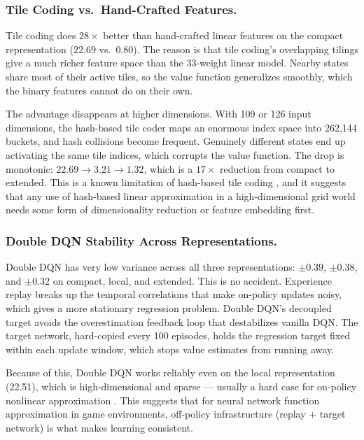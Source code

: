 \documentclass[letterpaper]{article}
\begin{document}
\subsubsection{Tile Coding vs.\ Hand-Crafted Features.}

Tile coding does $28\times$ better than hand-crafted linear features on the compact representation ($22.69$ vs.\ $0.80$). The reason is that tile coding's overlapping tilings give a much richer feature space than the 33-weight linear model. Nearby states share most of their active tiles, so the value function generalizes smoothly, which the binary features cannot do on their own.

The advantage disappears at higher dimensions. With 109 or 126 input dimensions, the hash-based tile coder maps an enormous index space into 262,144 buckets, and hash collisions become frequent. Genuinely different states end up activating the same tile indices, which corrupts the value function. The drop is monotonic: $22.69 \to 3.21 \to 1.32$, which is a $17\times$ reduction from compact to extended. This is a known limitation of hash-based tile coding \cite{sherstov2005tilecoding}, and it suggests that any use of hash-based linear approximation in a high-dimensional grid world needs some form of dimensionality reduction or feature embedding first.

\subsubsection{Double DQN Stability Across Representations.}

Double DQN has very low variance across all three representations: $\pm 0.39$, $\pm 0.38$, and $\pm 0.32$ on compact, local, and extended. This is no accident. Experience replay breaks up the temporal correlations that make on-policy updates noisy, which gives a more stationary regression problem. Double DQN's decoupled target avoids the overestimation feedback loop that destabilizes vanilla DQN. The target network, hard-copied every 100 episodes, holds the regression target fixed within each update window, which stops value estimates from running away.

Because of this, Double DQN works reliably even on the local representation (22.51), which is high-dimensional and sparse — usually a hard case for on-policy nonlinear approximation \cite{vanhasselt2018deadly}. This suggests that for neural network function approximation in game environments, off-policy infrastructure (replay + target network) is what makes learning consistent.
\end{document}
